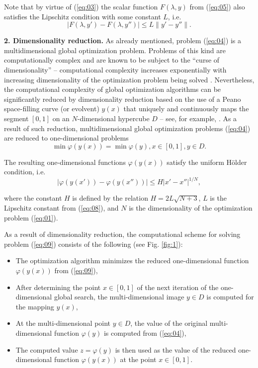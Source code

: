 \documentclass[runningheads]{llncs}
\begin{document}
Note that by virtue of (\ref{eq:03}) the scalar function $F(\lambda,y)$ from (\ref{eq:05}) also satisfies the Lipschitz condition with some constant $L$, i.e.
\begin{equation}
\label{eq:08}
|F(\lambda, y') - F(\lambda, y'')| \leq L\|y' - y''\|.
\end{equation}

\textbf{2. Dimensionality reduction.} As already mentioned, problem (\ref{eq:04}) is a multidimensional global optimization problem. Problems of this kind are computationally complex and are known to be subject to the ``curse of dimensionality'' -- computational complexity increases exponentially with increasing dimensionality of the optimization problem being solved \cite{c13,c14,c15,c16,c17,c18,c19,c20}. Nevertheless, the computational complexity of global optimization algorithms can be significantly reduced by dimensionality reduction based on the use of a Peano space-filling curve (or evolvent) $y(x)$ that uniquely and continuously maps the segment $[0,1]$ on an $N$-dimensional hypercube $D$ -- see, for example, \cite{c15,c21}. As a result of such reduction, multidimensional global optimization problems (\ref{eq:04}) are reduced to one-dimensional problems
\begin{equation}
\label{eq:09}
\min \varphi (y(x))= \min \varphi(y), x \in [0,1], y \in D.
\end{equation}

The resulting one-dimensional functions $\varphi(y(x))$ satisfy the uniform H{\" o}lder condition, i.e.
\begin{equation}
\label{eq:10}
|\varphi (y(x'))- \varphi (y(x''))| \leq H |x'-x''|^{1/N},
\end{equation}

where the constant $H$ is defined by the relation $H=2L\sqrt{N+3}$, $L$ is the Lipschitz constant from (\ref{eq:08}), and $N$ is the dimensionality of the optimization problem (\ref{eq:01}). 

As a result of dimensionality reduction, the computational scheme for solving problem (\ref{eq:09}) consists of the following (see Fig. \ref{fig:1}):

\begin{itemize}
	\item The optimization algorithm minimizes the reduced one-dimensional function $\varphi(y(x))$ from (\ref{eq:09}),
	\item After determining the point $x \in [0,1]$ of the next iteration of the one-dimensional global search, the multi-dimensional image $y \in D$ is computed for the mapping $y(x)$,
	\item At the multi-dimensional point $y \in D$, the value of the original multi-dimensional function $\varphi(y)$ is computed from (\ref{eq:04}),
	\item The computed value $z = \varphi(y)$ is then used as the value of the reduced one-dimensional function $\varphi(y(x))$ at  the point $x\in[0,1]$.
\end{itemize}
\end{document}
